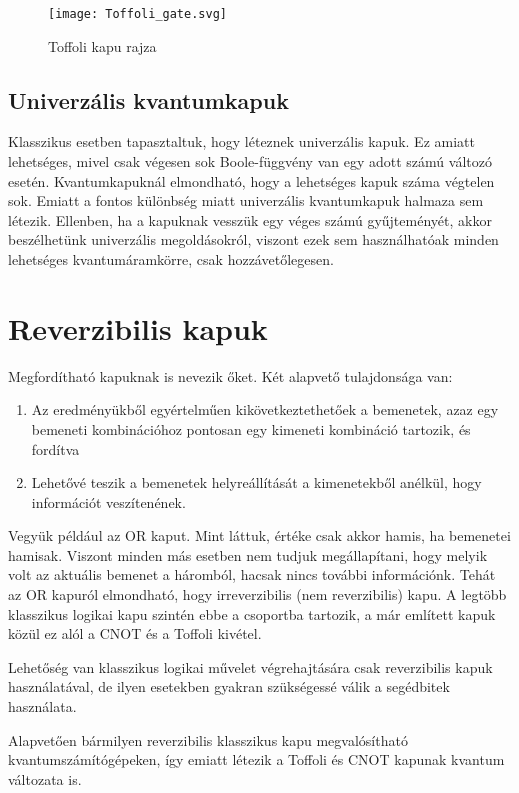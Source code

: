 \documentclass[
]{thesis-ekf}
\theoremstyle{definition}
\theoremstyle{remark}
\begin{document}
\begin{figure}[H]
	\centering
	\texttt{[image: Toffoli\_gate.svg]}
	\caption{Toffoli kapu rajza}
	\label{fig:toffoligate}
\end{figure}


\subsection{Univerzális kvantumkapuk}
Klasszikus esetben tapasztaltuk, hogy léteznek univerzális kapuk. Ez amiatt lehetséges, mivel csak végesen sok Boole-függvény van egy adott számú változó esetén. Kvantumkapuknál elmondható, hogy a lehetséges kapuk száma végtelen sok. Emiatt a fontos különbség miatt univerzális kvantumkapuk halmaza sem létezik. Ellenben, ha a kapuknak vesszük egy véges számú gyűjteményét, akkor beszélhetünk univerzális megoldásokról, viszont ezek sem használhatóak minden lehetséges kvantumáramkörre, csak hozzávetőlegesen.

\section{Reverzibilis kapuk}
Megfordítható kapuknak is nevezik őket. Két alapvető tulajdonsága van:
\begin{enumerate}
	\item Az eredményükből egyértelműen kikövetkeztethetőek a bemenetek, azaz egy bemeneti kombinációhoz pontosan egy kimeneti kombináció tartozik, és fordítva
	\item Lehetővé teszik a bemenetek helyreállítását a kimenetekből anélkül, hogy információt veszítenének.
\end{enumerate}

Vegyük például az OR kaput. Mint láttuk, értéke csak akkor hamis, ha bemenetei hamisak. Viszont minden más esetben nem tudjuk megállapítani, hogy melyik volt az aktuális bemenet a háromból, hacsak nincs további információnk. Tehát az OR kapuról elmondható, hogy irreverzibilis (nem reverzibilis) kapu. A legtöbb klasszikus logikai kapu szintén ebbe a csoportba tartozik, a már említett kapuk közül ez alól a CNOT és a Toffoli kivétel.

Lehetőség van klasszikus logikai művelet végrehajtására csak reverzibilis kapuk használatával, de ilyen esetekben gyakran szükségessé válik a segédbitek használata.

Alapvetően bármilyen reverzibilis klasszikus kapu megvalósítható kvantumszámítógépeken, így emiatt létezik a Toffoli és CNOT kapunak kvantum változata is.
\end{document}

